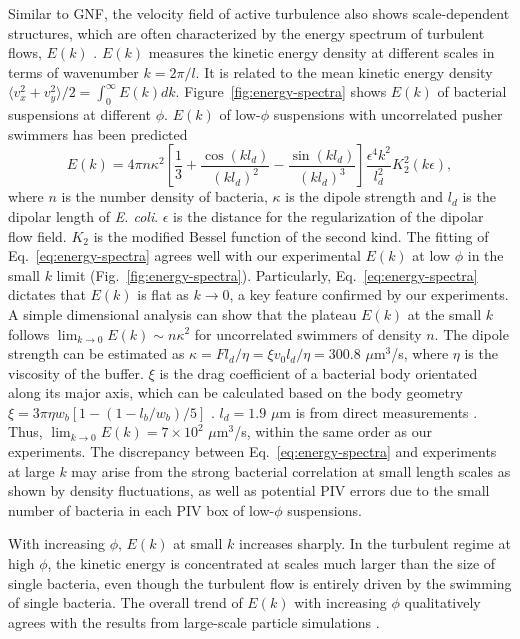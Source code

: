 \documentclass[twocolumn,aps,prx,amsmath,amssymb,longbibliography]{revtex4-2}
\begin{document}
Similar to GNF, the velocity field of active turbulence also shows scale-dependent structures, which are often characterized by the energy spectrum of turbulent flows, $E(k)$ \cite{Liu2020}. $E(k)$ measures the kinetic energy density at different scales in terms of wavenumber $k = 2\pi/l$. It is related to the mean kinetic energy density $\langle v_x^2 + v_y^2 \rangle/2 = \int_0^\infty E(k)dk$. Figure~\ref{fig:energy-spectra} shows $E(k)$ of bacterial suspensions at different $\phi$. $E(k)$ of low-$\phi$ suspensions with uncorrelated pusher swimmers has been predicted \cite{Bardfalvy2019}
\begin{equation}
\label{eq:energy-spectra}
E(k) = 4\pi n \kappa^2 \left[ \frac{1}{3} + \frac{\cos(kl_d)}{(kl_d)^2} - \frac{\sin(kl_d)}{(kl_d)^3} \right] \frac{\epsilon^4k^2}{l_d^2} K_2^2(k\epsilon),
\end{equation}
where $n$ is the number density of bacteria, $\kappa$ is the dipole strength and $l_d$ is the dipolar length of \textit{E. coli}. $\epsilon$ is the distance for the regularization of the dipolar flow field. $K_2$ is the modified Bessel function of the second kind.
The fitting of Eq.~\ref{eq:energy-spectra} agrees well with our experimental $E(k)$ at low $\phi$ in the small $k$ limit (Fig.~\ref{fig:energy-spectra}). Particularly, Eq.~\ref{eq:energy-spectra} dictates that $E(k)$ is flat as $k \to 0$, a key feature confirmed by our experiments. A simple dimensional analysis can show that the plateau $E(k)$ at the small $k$ follows $\lim_{k \to 0}E(k) \sim n \kappa^2$ for uncorrelated swimmers of density $n$. The dipole strength can be estimated as $\kappa = Fl_d/\eta = \xi v_0 l_d/\eta = 300.8$ $\mu$m$^3$/s, where $\eta$ is the viscosity of the buffer. $\xi$ is the drag coefficient of a bacterial body orientated along its major axis, which can be calculated based on the body geometry $\xi = 3\pi\eta w_b \left[1-(1-l_b/w_b)/5\right]$ \cite{Magariyama2002}. $l_d = 1.9$ $\mu$m is from direct measurements \cite{Drescher2011}. Thus, $\lim_{k \to 0}E(k) = 7 \times 10^2$ $\mu$m$^3$/s, within the same order as our experiments. The discrepancy between Eq.~\ref{eq:energy-spectra} and experiments at large $k$ may arise from the strong bacterial correlation at small length scales as shown by density fluctuations, as well as potential PIV errors due to the small number of bacteria in each PIV box of low-$\phi$ suspensions.

With increasing $\phi$, $E(k)$ at small $k$ increases sharply. In the turbulent regime at high $\phi$, the kinetic energy is concentrated at scales much larger than the size of single bacteria, even though the turbulent flow is entirely driven by the swimming of single bacteria. The overall trend of $E(k)$ with increasing $\phi$ qualitatively agrees with the results from large-scale particle simulations \cite{Saintillan2012,Bardfalvy2019}.
\end{document}
